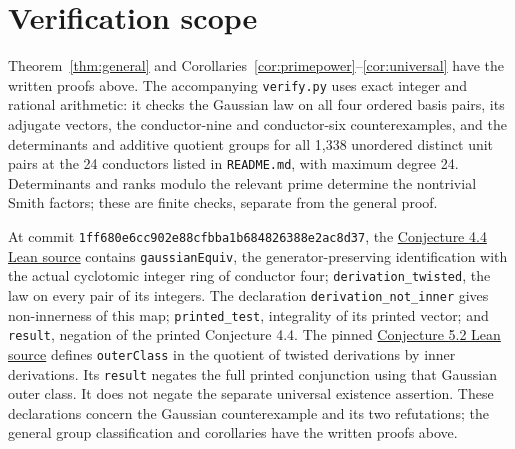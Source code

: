 \documentclass[11pt]{article}
\begin{document}
\section{Verification scope}
Theorem~\ref{thm:general} and Corollaries~\ref{cor:primepower}--\ref{cor:universal}
have the written proofs above. The accompanying \texttt{verify.py}
uses exact integer and rational arithmetic: it checks the Gaussian law
on all four ordered basis pairs, its adjugate vectors, the conductor-nine
and conductor-six counterexamples, and the determinants and additive quotient groups for
all 1,338 unordered distinct unit pairs at the 24 conductors listed in
\texttt{README.md}, with maximum degree 24. Determinants and ranks modulo
the relevant prime determine the nontrivial Smith factors; these are
finite checks, separate from the general proof.

At commit \texttt{1ff680e6cc902e88cfbba1b684826388e2ac8d37}, the
\href{https://github.com/the-omega-institute/trureturing/blob/1ff680e6cc902e88cfbba1b684826388e2ac8d37/D5/S3/Arith/TwistedDerivations/ManjuSharmaConjectureFourFour.lean}{Conjecture 4.4 Lean source}
contains \texttt{gaussianEquiv}, the generator-preserving identification
with the actual cyclotomic integer ring of conductor four;
\texttt{derivation\_twisted}, the law on every pair of its integers.
The declaration \texttt{derivation\_not\_inner} gives non-innerness of this map;
\texttt{printed\_test}, integrality of its printed vector; and
\texttt{result}, negation of the printed Conjecture 4.4.
The pinned
\href{https://github.com/the-omega-institute/trureturing/blob/1ff680e6cc902e88cfbba1b684826388e2ac8d37/D5/S3/Arith/TwistedDerivations/ManjuSharmaConjectureFiveTwo.lean}{Conjecture 5.2 Lean source}
defines \texttt{outerClass} in the quotient of twisted derivations by
inner derivations. Its \texttt{result} negates the full printed
conjunction using that Gaussian outer class. It does not negate the
separate universal existence assertion. These declarations concern
the Gaussian counterexample and its two refutations; the general
group classification and corollaries have the written proofs above.
\end{document}
